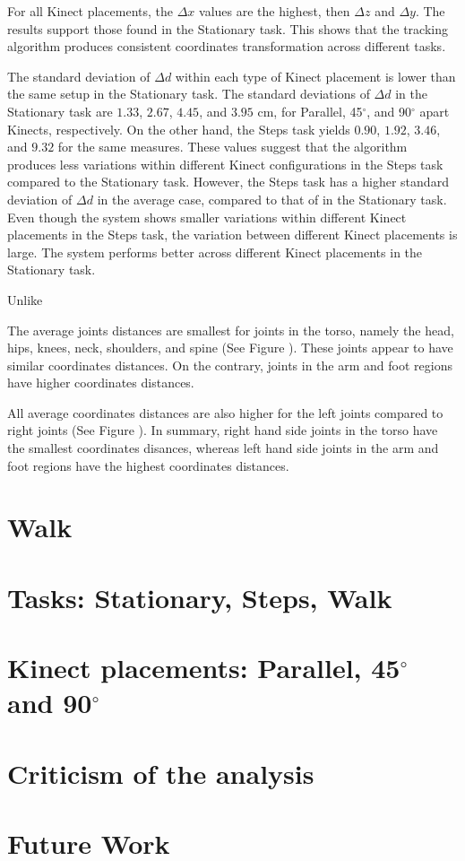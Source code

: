 For all Kinect placements, the $\Delta x$ values are the highest, then $\Delta z$ and $\Delta y$. The results support those found in the Stationary task. This shows that the tracking algorithm produces consistent coordinates transformation across different tasks.

The standard deviation of $\Delta d$ within each type of Kinect placement is lower than the same setup in the Stationary task. The standard deviations of $\Delta d$ in the Stationary task are $1.33$, $2.67$, $4.45$, and $3.95$ cm, for Parallel, 45$^{\circ}$, and 90$^{\circ}$ apart Kinects, respectively. On the other hand, the Steps task yields $0.90$, $1.92$, $3.46$, and $9.32$ for the same measures. These values suggest that the algorithm produces less variations within different Kinect configurations in the Steps task compared to the Stationary task. However, the Steps task has a higher standard deviation of $\Delta d$ in the average case, compared to that of in the Stationary task. Even though the system shows smaller variations within different Kinect placements in the Steps task, the variation between different Kinect placements is large. The system performs better across different Kinect placements in the Stationary task.

Unlike

The average joints distances are smallest for joints in the torso, namely the head, hips, knees, neck, shoulders, and spine (See Figure ). These joints appear to have similar coordinates distances. On the contrary, joints in the arm and foot regions have higher coordinates distances.

All average coordinates distances are also higher for the left joints compared to right joints (See Figure ). In summary, right hand side joints in the torso have the smallest coordinates disances, whereas left hand side joints in the arm and foot regions have the highest coordinates distances.

\section{Walk}
\label{sec:discussion_walk}



\section{Tasks: Stationary, Steps, Walk}
\label{sec:discussion_stationary}


\section{Kinect placements: Parallel, 45$^{\circ}$ and 90$^{\circ}$}
\label{sec:discussion_stationary}

\section{Criticism of the analysis}

\section{Future Work}
\label{sec:discussion_future_Work}


